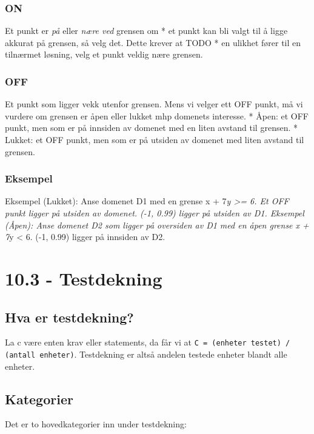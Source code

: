 \subsubsection{ON}

Et punkt er \emph{på} eller \emph{nære ved} grensen om * et punkt kan
bli valgt til å ligge akkurat på grensen, så velg det. Dette krever at
TODO * en ulikhet fører til en tilnærmet løsning, velg et punkt veldig
nære grensen.

\subsubsection{OFF}

Et punkt som ligger vekk utenfor grensen. Mens vi velger ett OFF punkt,
må vi vurdere om grensen er åpen eller lukket mhp domenets interesse. *
Åpen: et OFF punkt, men som er på innsiden av domenet med en liten
avstand til grensen. * Lukket: et OFF punkt, men som er på utsiden av
domenet med liten avstand til grensen.

\subsubsection{Eksempel}

Eksempel (Lukket): Anse domenet D1 med en grense x + 7\emph{y
\textgreater{}= 6. Et OFF punkt ligger på utsiden av domenet. (-1, 0.99)
ligger på utsiden av D1. Eksempel (Åpen): Anse domenet D2 som ligger på
oversiden av D1 med en åpen grense x + 7}y \textless{} 6. (-1, 0.99)
ligger på innsiden av D2.

\section{10.3 - Testdekning}

\subsection{Hva er testdekning?}

La c være enten krav eller statements, da får vi at
\texttt{C = (enheter testet) / (antall enheter)}. Testdekning er altså
andelen testede enheter blandt alle enheter.

\subsection{Kategorier}

Det er to hovedkategorier inn under testdekning:

